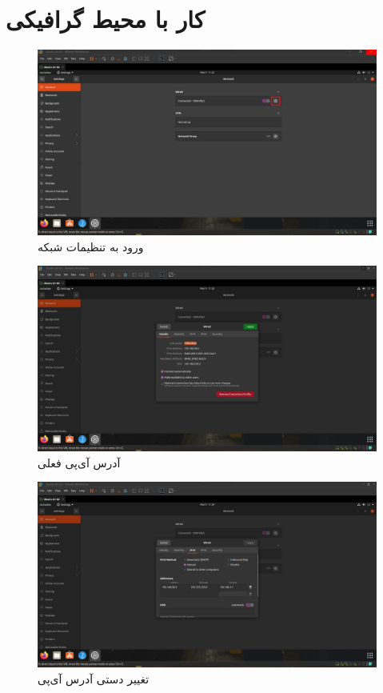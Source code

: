 \documentclass{article}
\begin{document}
\section{کار با محیط گرافیکی}
\begin{figure}[H]
    \centering
    \includegraphics[width=1.0\textwidth]{figures/6a.jpg}
    \caption
	{
ورود به تنظیمات شبکه
	}
    \label{fig:fig1}
\end{figure}
\begin{figure}[H]
    \centering
    \includegraphics[width=1.0\textwidth]{figures/6b.jpg}
    \caption
	{
آدرس آی‌پی فعلی
	}
    \label{fig:fig1}
\end{figure}
\begin{figure}[H]
    \centering
    \includegraphics[width=1.0\textwidth]{figures/6c.jpg}
    \caption
	{
تغییر دستی آدرس آی‌پی
	}
    \label{fig:fig1}
\end{figure}
\end{document}
